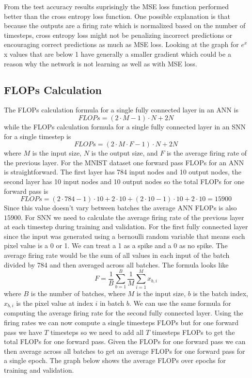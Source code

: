 \documentclass[12pt, letterpaper]{article}
\begin{document}
From the test accuracy results suprisingly the MSE loss function performed better than the cross entropy loss function. One possible explanation is that because the outputs are a firing rate which is normalized based on the number of timesteps, cross entropy loss might not be penalizing incorrect predictions or encouraging correct predictions as much as MSE loss. Looking at the graph for $e^{x}$ x values that are below 1 have generally a smaller gradient which could be a reason why the network is not learning as well as with MSE loss.

\subsection{FLOPs Calculation}
The FLOPs calculation formula for a single fully connected layer in an ANN is \[
    FLOPs = (2 \cdot M - 1) \cdot N + 2N
\] while the FLOPs calculation formula for a single fully connected layer in an SNN for a single timestep is \[
    FLOPs = (2 \cdot M \cdot F - 1) \cdot N + 2N
\] where $M$ is the input size, $N$ is the output size, and $F$ is the average firing rate of the previous layer. For the MNIST dataset one forward pass FLOPs for an ANN is straightforward. The first layer has 784 input nodes and 10 output nodes, the second layer has 10 input nodes and 10 output nodes so the total FLOPs for one forward pass is \[
    FLOPs = (2 \cdot 784 - 1) \cdot 10 + 2 \cdot 10 + (2 \cdot 10 - 1) \cdot 10 + 2 \cdot 10 = 15900
\] Since this value doesn't vary between batches the average ANN FLOPs is also $15900$. For SNN we need to calculate the average firing rate of the previous layer at each timestep during training and validation. For the first fully connected layer since the input was generated using a bernoulli random variable that means each pixel value is a 0 or 1. We can treat a 1 as a spike and a 0 as no spike. The average firing rate would be the sum of all values in each input of the batch divided by 784 and then averaged across all batches. The formula looks like \[
    F = \frac{1}{B} \sum_{b=1}^{B} \frac{1}{M} \sum_{i=1}^{M} x_{b,i}
\] where $B$ is the number of batches, where $M$ is the input size, $b$ is the batch index, $x_{b,i}$ is the pixel value at index $i$ in batch $b$. We can use the same formula for computing the average firing rate for the second fully connected layer. Using the firing rates we can now compute a single timesteps FLOPs but for one forward pass we have $T$ timesteps so we need to add all $T$ timesteps FLOPs to get the total FLOPs for one forward pass. Given the FLOPs for one forward pass we can then average across all batches to get an average FLOPs for one forward pass for a single epoch. The graph below shows the average FLOPs over epochs for training and validation.
\end{document}
